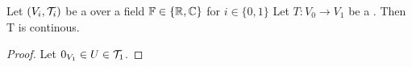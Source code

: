 \begin{prop}
\label{prop:boundedlinearoperatorsarecontinuous}
Let $(V_i,\mathcal{T}_i)$ be a \TVS over a field $\mathbb{F} \in \{\mathbb{R}, \mathbb{C}\}$ for $i \in \{0,1\}$
Let $T:V_0 \to V_1$ be a \BLO. 
Then T is continous. 
\begin{proof} 
    Let $0_{V_1} \in U \in \mathcal{T}_1$. 
\end{proof} 
\end{prop}
